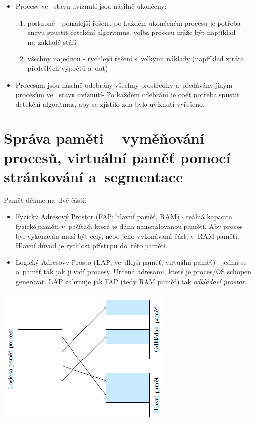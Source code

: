 \begin{itemize}
    \item Procesy ve~ stavu uvíznutí jsou násilně ukončeny: 
    \begin{enumerate}
        \item postupně - pomalejší řešení, po každém ukončeném procesu je potřeba znovu spustit detekční algoritmus, volba procesu může být například na~základě stáří
        \item všechny najednou - rychlejší řešení s~velkými náklady (například ztráta předešlých výpočtů a~dat)
    \end{enumerate}
    
    \item Procesům jsou násilně odebrány všechny prostředky a~předávány jiným procesům ve~ stavu uvíznutí- Po každém odebrání je opět potřeba spustit detekční algoritmus, aby se zjistilo zda bylo uvíznutí vyřešeno.
\end{itemize}


\clearpage
\section{Správa paměti -- vyměňování procesů, virtuální paměť pomocí stránkování a~segmentace}

Paměť dělíme na~dvě části:
\begin{itemize}
    \item Fyzický Adresový Prostor (FAP; hlavní paměť, RAM) - reálná kapacita fyzické paměti v~počítači která je dána nainstalovanou pamětí. Aby proces byl vykonáván musí být celý, nebo jeho vykonávaná část, v~RAM paměti. Hlavní důvod je rychlost přístupu do~této paměti. 
    \item Logický Adresový Prosto (LAP; ve~dlejší paměť, virtuální paměť) - jedná se o~paměť tak jak ji vidí procesy. Určená adresami, které je proces/OS schopen generovat. LAP zahrnuje jak FAP (tedy RAM paměť) tak \emph{odkládací prostor}.
\end{itemize}

\begin{center}
    \includegraphics[scale=1]{images/mem_lap.png} \label{mem:lap}
\end{center}

